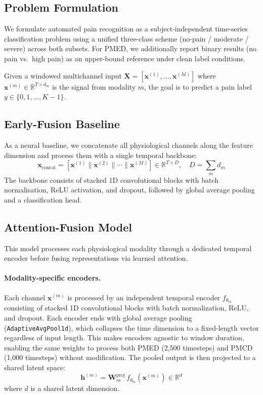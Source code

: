 \documentclass{article}
\begin{document}
\subsection{Problem Formulation}

We formulate automated pain recognition as a subject-independent time-series classification problem using a unified three-class scheme (no-pain / moderate / severe) across both subsets. For PMED, we additionally report binary results (no pain vs.\ high pain) as an upper-bound reference under clean label conditions.

Given a windowed multichannel input $\mathbf{X} = [\mathbf{x}^{(1)}, \ldots, \mathbf{x}^{(M)}]$ where $\mathbf{x}^{(m)} \in \mathbb{R}^{T \times d_m}$ is the signal from modality $m$, the goal is to predict a pain label $y \in \{0, 1, \ldots, K-1\}$.

\subsection{Early-Fusion Baseline}

As a neural baseline, we concatenate all physiological channels along the feature dimension and process them with a single temporal backbone:
\begin{equation}
    \mathbf{x}_{\text{concat}} = [\mathbf{x}^{(1)} \| \mathbf{x}^{(2)} \| \cdots \| \mathbf{x}^{(M)}] \in \mathbb{R}^{T \times D}, \quad D = \textstyle\sum_{m} d_m
\end{equation}
The backbone consists of stacked 1D convolutional blocks with batch normalisation, ReLU activation, and dropout, followed by global average pooling and a classification head.

\subsection{Attention-Fusion Model}

This model processes each physiological modality through a dedicated temporal encoder before fusing representations via learned attention.

\paragraph{Modality-specific encoders.}
Each channel $\mathbf{x}^{(m)}$ is processed by an independent temporal encoder $f_{\theta_m}$ consisting of stacked 1D convolutional blocks with batch normalization, ReLU, and dropout. Each encoder ends with global average pooling (\texttt{AdaptiveAvgPool1d}), which collapses the
time dimension to a fixed-length vector regardless of input length. This makes encoders agnostic to window duration, enabling the same weights to process both PMED (2{,}500 timesteps) and PMCD (1{,}000 timesteps) without modification. The pooled output is then projected to a shared latent space:
  \begin{equation}
      \mathbf{h}^{(m)}
      = \mathbf{W}_m^{\text{proj}}\, f_{\theta_m}(\mathbf{x}^{(m)})
      \in \mathbb{R}^{d}
  \end{equation}
  where $d$ is a shared latent dimension.
\end{document}
